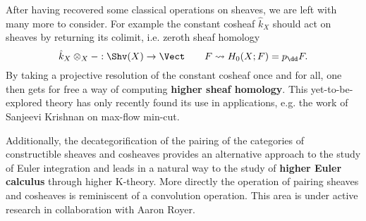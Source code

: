 After having recovered some classical operations on sheaves, we are left with many more to consider. For example the constant cosheaf $\hat{k}_X$ should act on sheaves by returning its colimit, i.e. zeroth sheaf homology
\[
	\hat{k}_X\otimes_X - :\Shv(X) \to \Vect \qquad F \rightsquigarrow H_0(X;F)=p_{\dd} F.
\]
By taking a projective resolution of the constant cosheaf once and for all, one then gets for free a way of computing \textbf{higher sheaf homology}. This yet-to-be-explored theory has only recently found its use in applications, e.g. the work of Sanjeevi Krishnan on max-flow min-cut.

Additionally, the decategorification of the pairing of the categories of constructible sheaves and cosheaves provides an alternative approach to the study of Euler integration and leads in a natural way to the study of \textbf{higher Euler calculus} through higher K-theory. More directly the operation of pairing sheaves and cosheaves is reminiscent of a convolution operation. This area is under active research in collaboration with Aaron Royer.

